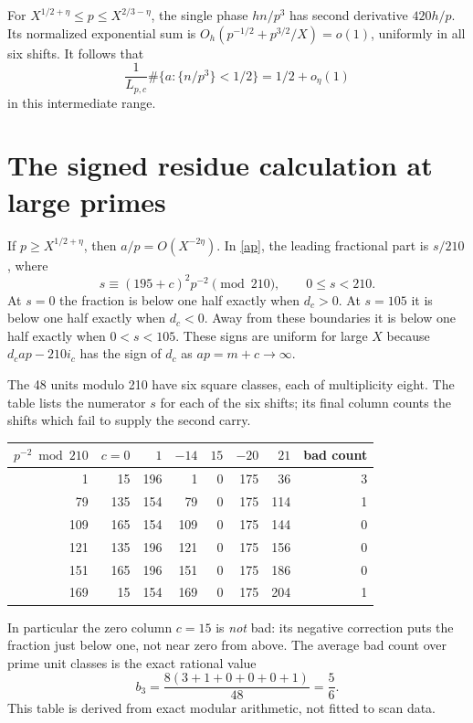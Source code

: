 \documentclass[11pt]{article}
\begin{document}
For $X^{1/2+\eta}\le p\le X^{2/3-\eta}$, the single phase $h n/p^3$ has second
derivative $420h/p$. Its normalized exponential sum is
$O_h(p^{-1/2}+p^{3/2}/X)=o(1)$, uniformly in all six shifts. It follows that
\begin{equation}\label{middle}
 \frac1{L_{p,c}}\#\{a:\{n/p^3\}<1/2\}=1/2+o_\eta(1)
\end{equation}
in this intermediate range.

\section{The signed residue calculation at large primes}
If $p\ge X^{1/2+\eta}$, then $a/p=O(X^{-2\eta})$. In \eqref{ap}, the leading
fractional part is $s/210$, where
\[
 s\equiv(195+c)^2p^{-2}\pmod{210},\qquad 0\le s<210.
\]
At $s=0$ the fraction is below one half exactly when $d_c>0$. At $s=105$ it
is below one half exactly when $d_c<0$. Away from these boundaries it is below
one half exactly when $0<s<105$. These signs are uniform for large $X$ because
$d_cap-210i_c$ has the sign of $d_c$ as $ap=m+c\to\infty$.

The 48 units modulo 210 have six square classes, each of multiplicity eight.
The table lists the numerator $s$ for each of the six shifts; its final column
counts the shifts which fail to supply the second carry.
\begin{center}
\small
\begin{tabular}{r|rrrrrr|r}
\toprule
$p^{-2}\bmod210$ & $c=0$ & $1$ & $-14$ & $15$ & $-20$ & $21$ & bad count\\
\midrule
1   &15 &196&1  &0&175&36 &3\\
79  &135&154&79 &0&175&114&1\\
109 &165&154&109&0&175&144&0\\
121 &135&196&121&0&175&156&0\\
151 &165&196&151&0&175&186&0\\
169 &15 &154&169&0&175&204&1\\
\bottomrule
\end{tabular}
\end{center}
In particular the zero column $c=15$ is \emph{not} bad: its negative correction
puts the fraction just below one, not near zero from above. The average bad
count over prime unit classes is the exact rational value
\begin{equation}\label{b}
 b_3=\frac{8(3+1+0+0+0+1)}{48}=\frac56.
\end{equation}
This table is derived from exact modular arithmetic, not fitted to scan data.
\end{document}

